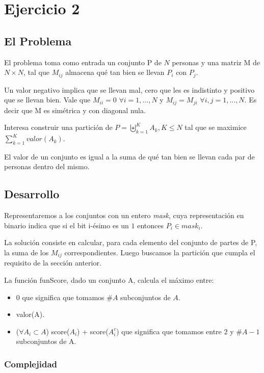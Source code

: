 \section{Ejercicio 2}

\subsection{El Problema}

El problema toma como entrada un conjunto P de $N$ personas y una matriz M de $N \times N$, tal que $M_{ij}$ almacena qu\'e tan bien se llevan $P_i$ con $P_j$.

Un valor negativo implica que se llevan mal, cero que les es indistinto y positivo que se llevan bien. Vale que $M_{ii} = 0$ $\forall i = 1,...,N$ y $M_{ij} = M_{ji}$  $\forall i,j = 1,...,N$. Es decir que M es sim\'etrica y con diagonal nula. 

Interesa construir una partici\'on de $P = \biguplus\limits_{k = 1}^{K} A_k, K \leq N$ tal que se maximice $\displaystyle\sum_{k = 1}^{K} valor(A_k)$.

El valor de un conjunto es igual a la suma de qu\'e tan bien se llevan cada par de personas dentro del mismo.

\subsection{Desarrollo}

Representaremos a los conjuntos con un entero \textit{mask}, cuya representaci\'on en binario indica que si el bit i-\'esimo es un $1$ entonces $P_i \in mask_i$.

La soluci\'on consiste en calcular, para cada elemento del conjunto de partes de P, la suma de los $M_{ij}$ correspondientes. Luego buscamos la partici\'on que cumpla el requisito de la secci\'on anterior.

La funci\'on funScore, dado un conjunto A, calcula el m\'aximo entre:

\begin{itemize}
	\item $0$ que significa que tomamos $\#A$ subconjuntos de $A$.
	\item valor(A).
	\item ($\forall A_i \subset A$) score($A_i$) + score($A_i^c$) que significa que tomamos entre $2$ y $\#A-1$ subconjuntos de A.
\end{itemize}

\subsubsection{Complejidad}


